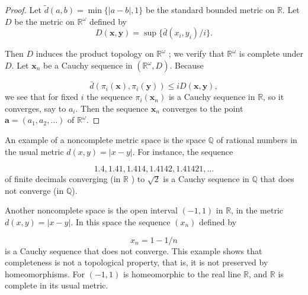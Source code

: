 \begin{proof}
 Let \(\widetilde{d}({a,b}) = \min \{ | {a - b}|, 1\}\) be the standard bounded metric on \(\mathbb{R}\). Let \(D\) be the metric on \(\mathbb{R}^{\omega }\) defined by
\[
D({\mathbf{x},\mathbf{y}}) = \sup \{ {\bar{d}({x_{i},y_{i}}) /i}\}.
\]

Then \(D\) induces the product topology on \(\mathbb{R}^{\omega }\) ; we verify that \(\mathbb{R}^{\omega }\) is complete under \(D\). Let \(\mathbf{x}_{n}\) be a Cauchy sequence in \(({\mathbb{R}^{\omega },D})\). Because

\[
\bar{d}({{\pi }_{i}( \mathbf{x}),{\pi }_{i}( \mathbf{y}) }) \leq {iD}({\mathbf{x},\mathbf{y}}),
\]
we see that for fixed \(i\) the sequence \({\pi }_{i}(\mathbf{x}_{n})\) is a Cauchy sequence in \(\mathbb{R}\), so it converges, say to \(a_{i}\). Then the sequence \(\mathbf{x}_{n}\) converges to the point \(\mathbf{a} = ({a_{1},a_{2},\ldots })\) of \(\mathbb{R}^{\omega }\).
\end{proof}

\begin{centeredblock}
\begin{example}
\label{ex:\thesection.\theexample}
 An example of a noncomplete metric space is the space \(\mathbb{Q}\) of rational numbers in the usual metric \(d({x,y}) = | {x - y}|\). For instance, the sequence

\[
{1.4},{1.41},{1.414},{1.4142},{1.41421},\ldots
\]
of finite decimals converging (in \(\mathbb{R}\) ) to \(\sqrt{2}\) is a Cauchy sequence in \(\mathbb{Q}\) that does not converge (in \(\mathbb{Q}\)).
\end{example}
\end{centeredblock}

\begin{centeredblock}
\begin{example}
\label{ex:\thesection.\theexample}
Another noncomplete space is the open interval \((-1,1)\) in \(\mathbb{R}\), in the metric \(d({x,y}) = | {x - y}|\). In this space the sequence \((x_{n})\) defined by

\[
x_{n} = 1 - 1/n
\]
is a Cauchy sequence that does not converge. This example shows that completeness is not a topological property, that is, it is not preserved by homeomorphisms. For \((-1,1)\) is homeomorphic to the real line \(\mathbb{R}\), and \(\mathbb{R}\) is complete in its usual metric.
\end{example}
\end{centeredblock}

